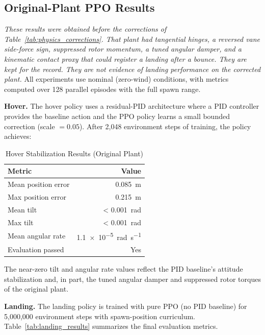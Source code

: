 \documentclass[conference]{IEEEtran}
\begin{document}
\subsection{Original-Plant PPO Results}
\label{sec:legacy_results}

\emph{These results were obtained before the corrections of Table~\ref{tab:physics_corrections}. That plant had tangential hinges, a reversed vane side-force sign, suppressed rotor momentum, a tuned angular damper, and a kinematic contact proxy that could register a landing after a bounce. They are kept for the record. They are not evidence of landing performance on the corrected plant.} All experiments use nominal (zero-wind) conditions, with metrics computed over 128 parallel episodes with the full spawn range.

\textbf{Hover.} The hover policy uses a residual-PID architecture where a PID controller provides the baseline action and the PPO policy learns a small bounded correction (scale $= 0.05$). After 2{,}048 environment steps of training, the policy achieves:

\begin{table}[htbp]
\caption{Hover Stabilization Results (Original Plant)}
\label{tab:hover_results}
\centering
\begin{tabular}{lr}
\toprule
\textbf{Metric} & \textbf{Value} \\
\midrule
Mean position error & \SI{0.085}{\metre} \\
Max position error & \SI{0.215}{\metre} \\
Mean tilt & \SI{< 0.001}{\radian} \\
Max tilt & \SI{< 0.001}{\radian} \\
Mean angular rate & \SI{1.1e-5}{\radian\per\second} \\
Evaluation passed & Yes \\
\bottomrule
\end{tabular}
\end{table}

The near-zero tilt and angular rate values reflect the PID baseline's attitude stabilization and, in part, the tuned angular damper and suppressed rotor torques of the original plant.

\textbf{Landing.} The landing policy is trained with pure PPO (no PID baseline) for 5{,}000{,}000 environment steps with spawn-position curriculum. Table~\ref{tab:landing_results} summarizes the final evaluation metrics.
\end{document}
